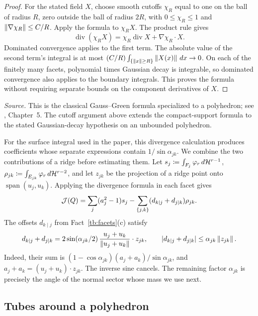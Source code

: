 \documentclass[11pt,letterpaper]{article}
\theoremstyle{plain}
\begin{document}
\begin{proof}
For the stated field \(X\), choose smooth cutoffs \(\chi_R\) equal to
one on the ball of radius \(R\), zero outside the ball of radius
\(2R\), with \(0\le\chi_R\le1\) and
\(\left\lVert\nabla\chi_R\right\rVert\le C/R\). Apply the formula to \(\chi_RX\).
The product rule gives
\[
 \operatorname{div}(\chi_RX)
 =\chi_R\operatorname{div}X+\nabla\chi_R\cdot X.
\]
Dominated convergence applies to the first term. The absolute value
of the second term's integral is at most
\((C/R)\int_{\{\left\lVert x\right\rVert\ge R\}}\left\lVert X(x)\right\rVert\,dx\to0\).
On each of the finitely many facets, polynomial times Gaussian decay
is integrable, so dominated convergence also applies to the boundary
integrals. This proves the formula without requiring separate bounds
on the component derivatives of \(X\).
\end{proof}

\emph{Source.} This is the classical Gauss--Green formula specialized
to a polyhedron; see , Chapter~5. The cutoff argument above
extends the compact-support formula to the stated Gaussian-decay
hypothesis on an unbounded polyhedron.

For the surface integral used in the paper, this divergence
calculation produces coefficients whose separate expressions contain
\(1/\sin\alpha_{jk}\). We combine the two contributions of a ridge
before estimating them. Let
\(s_j\coloneqq \int_{F_j}\varphi_r\,d\mathcal H^{r-1}\),
\(\rho_{jk}\coloneqq \int_{E_{jk}}\varphi_r\,d\mathcal H^{r-2}\), and let
\(z_{jk}\) be the projection of a ridge point onto
\(\operatorname{span}(u_j,u_k)\). Applying the divergence formula in
each facet gives
\[
 \mathcal J(Q)=\sum_j(a_j^2-1)s_j
       -\sum_{\{j,k\}}(d_{k\mid j}+d_{j\mid k})\rho_{jk}.
\]
The offsets \(d_{k\mid j}\) from Fact~\ref{tb:facets}(c) satisfy
\[
 d_{k\mid j}+d_{j\mid k}
 =2\sin(\alpha_{jk}/2)\,
       \frac{u_j+u_k}{\left\lVert u_j+u_k\right\rVert}\cdot z_{jk},\qquad
 |d_{k\mid j}+d_{j\mid k}|\le\alpha_{jk}\left\lVert z_{jk}\right\rVert.
\]
Indeed, their sum is
\((1-\cos\alpha_{jk})(a_j+a_k)/\sin\alpha_{jk}\), and
\(a_j+a_k=(u_j+u_k)\cdot z_{jk}\).
The inverse sine cancels. The remaining factor \(\alpha_{jk}\)
is precisely the angle of the normal sector whose mass we use next.

\subsection{Tubes around a polyhedron}\label{tb:sec:tubes}
\end{document}
